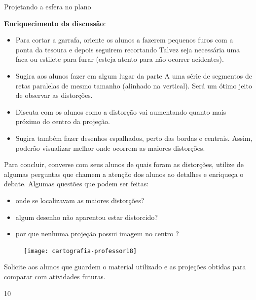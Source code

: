 \begin{sugestions}{Projetando a esfera no plano}
{
  \textbf{Enriquecimento da discussão}:
\begin{itemize}
\item  Para cortar a garrafa, oriente os alunos a fazerem pequenos furos com a ponta da tesoura e depois seguirem recortando Talvez seja necessária uma faca ou estilete para furar (esteja atento para não ocorrer acidentes).

\item Sugira aos alunos fazer em algum lugar da parte A uma série de segmentos de retas paralelas de mesmo tamanho (alinhado na vertical). Será um ótimo jeito de observar as distorções.

\item Discuta com os alunos como a distorção vai aumentando quanto mais próximo do centro da projeção.

 \item Sugira também fazer desenhos espalhados, perto das bordas e centrais. Assim, poderão visualizar melhor onde ocorrem as maiores distorções.

\end{itemize}
 


  Para concluir, converse com seus alunos de quais foram as distorções, utilize de algumas perguntas que chamem a atenção dos alunos ao detalhes e enriqueça o debate. Algumas questões que podem ser feitas:
  \begin{itemize}
  \item onde se localizavam as maiores distorções?
  \item algum desenho não aparentou estar distorcido?
  \item por que nenhuma projeção possui imagem no centro ?
  \end{itemize}

  \begin{figure}[H]
  \centering
  
  \texttt{[image: cartografia-professor18]}
  \end{figure}

 Solicite aos alunos que guardem o material utilizado e as projeções obtidas para comparar com atividades futuras.

  }{1}{0}
\end{sugestions}
\label{Pplanas}

